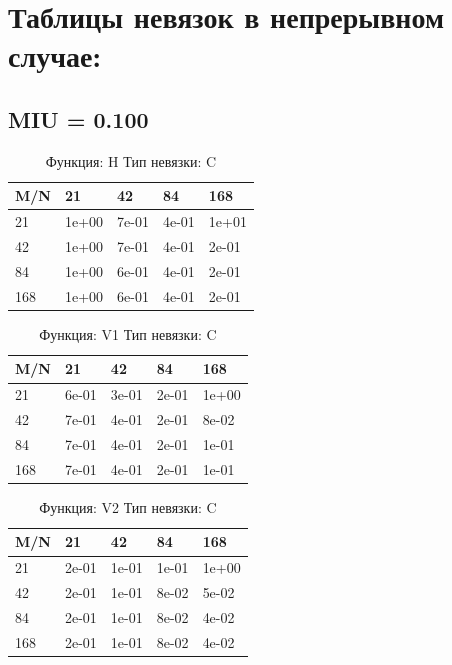 \documentclass[a4paper,11pt]{article}
\begin{document}
\newpage
\section{Таблицы невязок в непрерывном случае:}
\subsection{MIU = 0.100}
\begin{table}[H]
\caption {Функция: H Тип невязки: C   }
\begin{center}
\begin{tabular}{l|l|l|l|l}
\hline
M/N  & 21 & 42 & 84 & 168 \\ \hline
  21 & 1e+00& 7e-01& 4e-01& 1e+01\\ \hline
  42 & 1e+00& 7e-01& 4e-01& 2e-01\\ \hline
  84 & 1e+00& 6e-01& 4e-01& 2e-01\\ \hline
 168 & 1e+00& 6e-01& 4e-01& 2e-01\\ \hline
\end{tabular}
\end{center}
\end{table}
\begin{table}[H]
\caption {Функция: V1 Тип невязки: C   }
\begin{center}
\begin{tabular}{l|l|l|l|l}
\hline
M/N  & 21 & 42 & 84 & 168 \\ \hline
  21 & 6e-01& 3e-01& 2e-01& 1e+00\\ \hline
  42 & 7e-01& 4e-01& 2e-01& 8e-02\\ \hline
  84 & 7e-01& 4e-01& 2e-01& 1e-01\\ \hline
 168 & 7e-01& 4e-01& 2e-01& 1e-01\\ \hline
\end{tabular}
\end{center}
\end{table}
\begin{table}[H]
\caption {Функция: V2 Тип невязки: C   }
\begin{center}
\begin{tabular}{l|l|l|l|l}
\hline
M/N  & 21 & 42 & 84 & 168 \\ \hline
  21 & 2e-01& 1e-01& 1e-01& 1e+00\\ \hline
  42 & 2e-01& 1e-01& 8e-02& 5e-02\\ \hline
  84 & 2e-01& 1e-01& 8e-02& 4e-02\\ \hline
 168 & 2e-01& 1e-01& 8e-02& 4e-02\\ \hline
\end{tabular}
\end{center}
\end{table}
\end{document}
